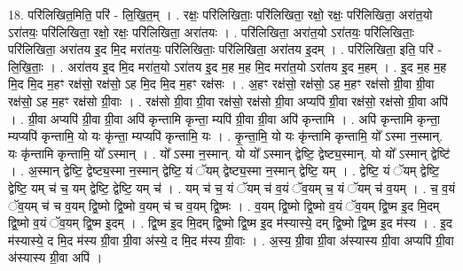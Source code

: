 \documentclass[17pt]{extarticle}
\begin{document}
18. परि॑लिखित॒मिति॒ परि॑ - लि॒खि॒त॒म् । . रक्षः॒ परि॑लिखिताः॒ परि॑लिखिता॒ रक्षो॒ रक्षः॒ परि॑लिखिता॒ अरा॑त॒यो ऽरा॑तयः॒ परि॑लिखिता॒ रक्षो॒ रक्षः॒ परि॑लिखिता॒ अरा॑तयः । . परि॑लिखिता॒ अरा॑त॒यो ऽरा॑तयः॒ परि॑लिखिताः॒ परि॑लिखिता॒ अरा॑तय इ॒द मि॒द मरा॑तयः॒ परि॑लिखिताः॒ परि॑लिखिता॒ अरा॑तय इ॒दम् । . परि॑लिखिता॒ इति॒ परि॑ - लि॒खि॒ताः॒ । . अरा॑तय इ॒द मि॒द मरा॑त॒यो ऽरा॑तय इ॒द म॒ह म॒ह मि॒द मरा॑त॒यो ऽरा॑तय इ॒द म॒हम् । . इ॒द म॒ह म॒ह मि॒द मि॒द म॒हꣳ रक्ष॑सो॒ रक्ष॑सो॒ ऽह मि॒द मि॒द म॒हꣳ रक्ष॑सः । . अ॒हꣳ रक्ष॑सो॒ रक्ष॑सो॒ ऽह म॒हꣳ रक्ष॑सो ग्री॒वा ग्री॒वा रक्ष॑सो॒ ऽह म॒हꣳ रक्ष॑सो ग्री॒वाः । . रक्ष॑सो ग्री॒वा ग्री॒वा रक्ष॑सो॒ रक्ष॑सो ग्री॒वा अप्यपि॑ ग्री॒वा रक्ष॑सो॒ रक्ष॑सो ग्री॒वा अपि॑ । . ग्री॒वा अप्यपि॑ ग्री॒वा ग्री॒वा अपि॑ कृन्तामि कृन्ता॒ म्यपि॑ ग्री॒वा ग्री॒वा अपि॑ कृन्तामि । . अपि॑ कृन्तामि कृन्ता॒ म्यप्यपि॑ कृन्तामि॒ यो यः कृ॑न्ता॒ म्यप्यपि॑ कृन्तामि॒ यः । . कृ॒न्ता॒मि॒ यो यः कृ॑न्तामि कृन्तामि॒ यो᳚ ऽस्मा न॒स्मान्. यः कृ॑न्तामि कृन्तामि॒ यो᳚ ऽस्मान् । . यो᳚ ऽस्मा न॒स्मान्. यो यो᳚ ऽस्मान् द्वेष्टि॒ द्वेष्ट्य॒स्मान्. यो यो᳚ ऽस्मान् द्वेष्टि॑ । . अ॒स्मान् द्वेष्टि॒ द्वेष्ट्य॒स्मा न॒स्मान् द्वेष्टि॒ यं ॅयम् द्वेष्ट्य॒स्मा न॒स्मान् द्वेष्टि॒ यम् । . द्वेष्टि॒ यं ॅयम् द्वेष्टि॒ द्वेष्टि॒ यम् च॑ च॒ यम् द्वेष्टि॒ द्वेष्टि॒ यम् च॑ । . यम् च॑ च॒ यं ॅयम् च॑ व॒यं ॅव॒यम् च॒ यं ॅयम् च॑ व॒यम् । . च॒ व॒यं ॅव॒यम् च॑ च व॒यम् द्वि॒ष्मो द्वि॒ष्मो व॒यम् च॑ च व॒यम् द्वि॒ष्मः । . व॒यम् द्वि॒ष्मो द्वि॒ष्मो व॒यं ॅव॒यम् द्वि॒ष्म इ॒द मि॒दम् द्वि॒ष्मो व॒यं ॅव॒यम् द्वि॒ष्म इ॒दम् । . द्वि॒ष्म इ॒द मि॒दम् द्वि॒ष्मो द्वि॒ष्म इ॒द म॑स्यास्ये॒ दम् द्वि॒ष्मो द्वि॒ष्म इ॒द म॑स्य । . इ॒द म॑स्यास्ये॒ द मि॒द म॑स्य ग्री॒वा ग्री॒वा अ॑स्ये॒ द मि॒द म॑स्य ग्री॒वाः । . अ॒स्य॒ ग्री॒वा ग्री॒वा अ॑स्यास्य ग्री॒वा अप्यपि॑ ग्री॒वा अ॑स्यास्य ग्री॒वा अपि॑ । \newline
\end{document}
